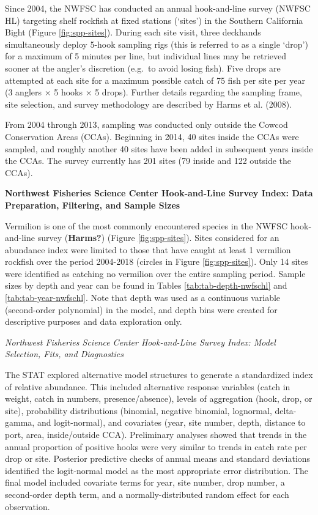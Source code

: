 \documentclass[11pt,
  english,
]{article}
\begin{document}
\leavevmode\tagmcend\tagstructend

Since 2004, the NWFSC has conducted an annual hook-and-line survey (NWFSC HL) targeting shelf rockfish at fixed stations (`sites') in the Southern California Bight (Figure \ref{fig:spp-sites}). During each site visit, three deckhands simultaneously deploy 5-hook sampling rigs (this is referred to as a single `drop') for a maximum of 5 minutes per line, but individual lines may be retrieved sooner at the angler's discretion (e.g.~to avoid losing fish). Five drops are attempted at each site for a maximum possible catch of 75 fish per site per year (3 anglers × 5 hooks × 5 drops). Further details regarding the sampling frame, site selection, and survey methodology are described by Harms et al. {(2008)\leavevmode\tagmcend\tagstructend}.

From 2004 through 2013, sampling was conducted only outside the Cowcod Conservation Areas (CCAs). Beginning in 2014, 40 sites inside the CCAs were sampled, and roughly another 40 sites have been added in subsequent years inside the CCAs. The survey currently has 201 sites (79 inside and 122 outside the CCAs).

\textbf{Northwest Fisheries Science Center Hook-and-Line Survey Index: Data Preparation, Filtering, and Sample Sizes}

Vermilion is one of the most commonly encountered species in the NWFSC hook-and-line survey {(\textbf{Harms?})\leavevmode\tagmcend\tagstructend} (Figure \ref{fig:spp-sites}). Sites considered for an abundance index were limited to those that have caught at least 1 vermilion rockfish over the period 2004-2018 (circles in Figure \ref{fig:spp-sites}). Only 14 sites were identified as catching no vermilion over the entire sampling period. Sample sizes by depth and year can be found in Tables \ref{tab:tab-depth-nwfschl} and \ref{tab:tab-year-nwfschl}. Note that depth was used as a continuous variable (second-order polynomial) in the model, and depth bins were created for descriptive purposes and data exploration only.

\emph{Northwest Fisheries Science Center Hook-and-Line Survey Index: Model Selection, Fits, and Diagnostics}

The STAT explored alternative model structures to generate a standardized index of relative abundance. This included alternative response variables (catch in weight, catch in numbers, presence/absence), levels of aggregation (hook, drop, or site), probability distributions (binomial, negative binomial, lognormal, delta-gamma, and logit-normal), and covariates (year, site number, depth, distance to port, area, inside/outside CCA). Preliminary analyses showed that trends in the annual proportion of positive hooks were very similar to trends in catch rate per drop or site. Posterior predictive checks of annual means and standard deviations identified the logit-normal model as the most appropriate error distribution. The final model included covariate terms for year, site number, drop number, a second-order depth term, and a normally-distributed random effect for each observation.
\end{document}
